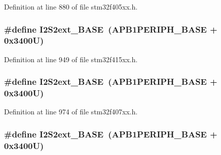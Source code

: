 Definition at line 880 of file stm32f405xx.\+h.

\subsubsection[{\texorpdfstring{I2\+S2ext\+\_\+\+B\+A\+SE}{I2S2ext_BASE}}]{\setlength{\rightskip}{0pt plus 5cm}\#define I2\+S2ext\+\_\+\+B\+A\+SE~({\bf A\+P\+B1\+P\+E\+R\+I\+P\+H\+\_\+\+B\+A\+SE} + 0x3400\+U)}\hypertarget{group___peripheral__registers__structures_gaa5f7b241ed5b756decd835300c9e7bc9}{}\label{group___peripheral__registers__structures_gaa5f7b241ed5b756decd835300c9e7bc9}


Definition at line 949 of file stm32f415xx.\+h.

\subsubsection[{\texorpdfstring{I2\+S2ext\+\_\+\+B\+A\+SE}{I2S2ext_BASE}}]{\setlength{\rightskip}{0pt plus 5cm}\#define I2\+S2ext\+\_\+\+B\+A\+SE~({\bf A\+P\+B1\+P\+E\+R\+I\+P\+H\+\_\+\+B\+A\+SE} + 0x3400\+U)}\hypertarget{group___peripheral__registers__structures_gaa5f7b241ed5b756decd835300c9e7bc9}{}\label{group___peripheral__registers__structures_gaa5f7b241ed5b756decd835300c9e7bc9}


Definition at line 974 of file stm32f407xx.\+h.

\subsubsection[{\texorpdfstring{I2\+S2ext\+\_\+\+B\+A\+SE}{I2S2ext_BASE}}]{\setlength{\rightskip}{0pt plus 5cm}\#define I2\+S2ext\+\_\+\+B\+A\+SE~({\bf A\+P\+B1\+P\+E\+R\+I\+P\+H\+\_\+\+B\+A\+SE} + 0x3400\+U)}\hypertarget{group___peripheral__registers__structures_gaa5f7b241ed5b756decd835300c9e7bc9}{}\label{group___peripheral__registers__structures_gaa5f7b241ed5b756decd835300c9e7bc9}


